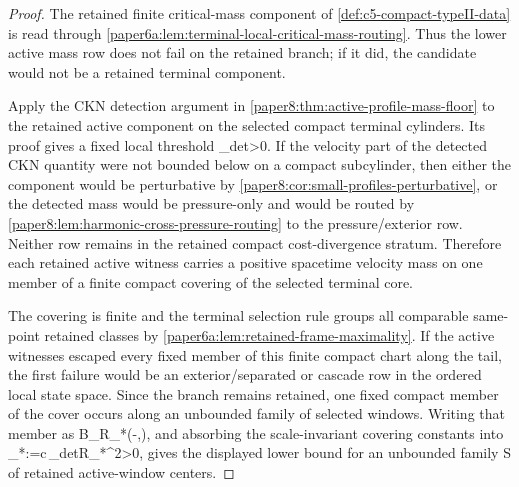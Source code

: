 \documentclass[11pt]{amsart}
\def\({}%
\def\){}%
\theoremstyle{plain}
\theoremstyle{definition}
\theoremstyle{remark}
\begin{document}
\begin{proof}
The retained finite critical-mass component of
\cref{def:c5-compact-typeII-data} is read through
\cref{paper6a:lem:terminal-local-critical-mass-routing}.  Thus the lower active
mass row does not fail on the retained branch; if it did, the candidate would
not be a retained terminal component.
\par
Apply the CKN detection argument in
\cref{paper8:thm:active-profile-mass-floor} to the retained active component on
the selected compact terminal cylinders.  Its proof gives a fixed local
threshold \(\eta_{\rm det}>0\).  If the velocity part of the detected CKN
quantity were not bounded below on a compact subcylinder, then either the
component would be perturbative by
\cref{paper8:cor:small-profiles-perturbative}, or the detected mass would be
pressure-only and would be routed by
\cref{paper8:lem:harmonic-cross-pressure-routing} to the pressure/exterior
row.  Neither row remains in the retained compact cost-divergence stratum.
Therefore each retained active witness carries a positive spacetime velocity
mass on one member of a finite compact covering of the selected terminal core.
\par
The covering is finite and the terminal selection rule groups all comparable
same-point retained classes by
\cref{paper6a:lem:retained-frame-maximality}.  If the active witnesses escaped
every fixed member of this finite compact chart along the tail, the first
failure would be an exterior/separated or cascade row in the ordered local
state space.  Since the branch remains retained, one fixed compact member of
the cover occurs along an unbounded family of selected windows.  Writing that
member as \(B_{R_*}\times(-\theta,\theta)\), and absorbing the scale-invariant
covering constants into
\(\eta_*:=c\,\eta_{\rm det}R_*^2>0\), gives the displayed lower bound for an
unbounded family \(\mathcal S\) of retained active-window centers.
\end{proof}
\end{document}
